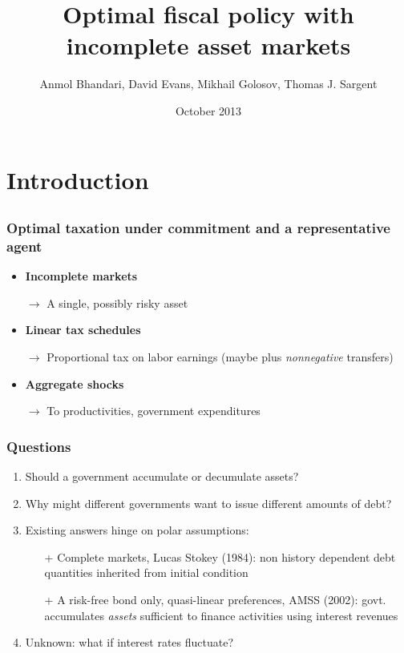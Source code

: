 \documentclass{beamer}
\title {Optimal fiscal policy with incomplete asset markets}
\author{Anmol Bhandari, David Evans, Mikhail Golosov, Thomas J. Sargent}
\date{October 2013}
\begin{document}
%
\begin{frame}
\titlepage

\end{frame}
\section{Introduction}
\subsection{}
\begin{frame}
\frametitle{Optimal taxation under commitment and a representative agent}

\begin{itemize}

 \item \textbf{Incomplete markets}

 \quad \color{red}$\rightarrow$ \color{black} A single, possibly risky asset

 \item \textbf{Linear tax schedules}

 \quad \color{red}$\rightarrow$ \color{black}Proportional tax on labor earnings (maybe plus  {\em nonnegative} transfers)

 \item \textbf{Aggregate shocks}

 \quad \color{red}$\rightarrow$ \color{black} To productivities, government expenditures

 \end{itemize}
\end{frame}



\begin{frame}
\frametitle{Questions}

\begin{enumerate}
\item Should a  government accumulate or decumulate assets?
\item Why might different governments want to issue different amounts of debt?
\item Existing answers hinge on polar assumptions:
\begin{itemize}
 \item [+] Complete markets, Lucas Stokey (1984): non history dependent debt quantities inherited from initial condition
 \item [+ ] A risk-free bond only, quasi-linear preferences, AMSS (2002): govt. accumulates {\em assets} sufficient to finance activities using interest revenues
\end{itemize}
\item Unknown: what if interest rates fluctuate?
\end{enumerate}
\end{frame}
\end{document}
